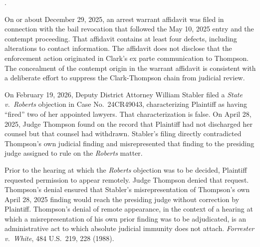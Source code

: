 \documentclass[12pt,letterpaper]{article}
\newcounter{complaintpara}
\newenvironment{paras}{%
	\begin{list}{\arabic{complaintpara}.}{%
			\setlength{\leftmargin}{0.5in}%
			\setlength{\labelwidth}{0.4in}%
			\setlength{\labelsep}{0.1in}%
			\setlength{\itemsep}{0pt}%
			\setlength{\parsep}{0pt}%
			\setlength{\topsep}{6pt}%
		}%
	}{%
	\end{list}%
}
\begin{document}
\begin{paras}
		\item\label{fact:bailrevoke2} On or about December 29, 2025,
		an arrest warrant affidavit was filed in connection with the
		bail revocation that followed the May 10, 2025 entry and the
		contempt proceeding. That affidavit contains at least four
		defects, including alterations to contact information. The
		affidavit does not disclose that the enforcement action
		originated in Clark's ex parte communication to Thompson.
		The concealment of the contempt origin in the warrant
		affidavit is consistent with a deliberate effort to suppress
		the Clark-Thompson chain from judicial review.
		
		\item\label{fact:stabler} On February 19, 2026, Deputy District
		Attorney William Stabler filed a \textit{State v.\ Roberts}
		objection in Case No.\ 24CR49043, characterizing Plaintiff as
		having ``fired'' two of her appointed lawyers. That
		characterization is false. On April 28, 2025, Judge Thompson
		found on the record that Plaintiff had not discharged her
		counsel but that counsel had withdrawn. Stabler's filing
		directly contradicted Thompson's own judicial finding and
		misrepresented that finding to the presiding judge assigned to
		rule on the \textit{Roberts} matter.
		
		\item\label{fact:thompsonremote} Prior to the hearing at which
		the \textit{Roberts} objection was to be decided, Plaintiff
		requested permission to appear remotely. Judge Thompson denied
		that request. Thompson's denial ensured that Stabler's
		misrepresentation of Thompson's own April 28, 2025 finding
		would reach the presiding judge without correction by
		Plaintiff. Thompson's denial of remote appearance, in the
		context of a hearing at which a misrepresentation of his own
		prior finding was to be adjudicated, is an administrative act
		to which absolute judicial immunity does not attach.
		\textit{Forrester v.\ White}, 484 U.S.\ 219, 228 (1988).
		
	\end{paras}
\end{document}

